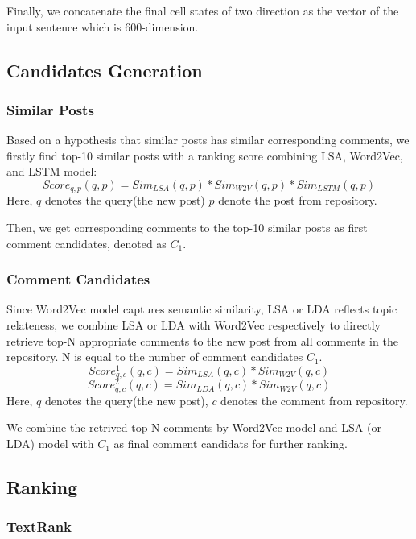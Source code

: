 \documentclass{sig-alternate}
\begin{document}
Finally, we concatenate the final cell states of two direction as the vector of 
the input sentence which is 600-dimension.

\subsection{Candidates Generation}

\subsubsection{Similar Posts}
Based on a hypothesis that similar posts has similar corresponding comments, we firstly find top-10 similar posts with a ranking score combining LSA, Word2Vec, and LSTM model:
\begin{equation}
   Score_{q,p}(q, p) = Sim_{LSA}(q, p) * Sim_{W2V}(q, p) * Sim_{LSTM}(q, p)
\end{equation}
Here, $q$ denotes the query(the new post) $p$ denote the post from repository.

Then, we get corresponding comments to the top-10 similar posts as first comment candidates, denoted as $C_1$.

\subsubsection{Comment Candidates}
Since Word2Vec model captures semantic similarity, LSA or LDA reflects topic relateness, we combine LSA or LDA with Word2Vec respectively to directly retrieve top-N appropriate comments to the new post from all comments in the repository. N is equal to the number of comment candidates $C_1$. 
\begin{equation}
   Score_{q,c}^1(q, c) = Sim_{LSA}(q, c) * Sim_{W2V}(q, c)
\end{equation}
\begin{equation}
   Score_{q,c}^2(q, c) = Sim_{LDA}(q, c) * Sim_{W2V}(q, c)
\end{equation}
Here, $q$ denotes the query(the new post), $c$ denotes the comment from repository.

We combine the retrived top-N comments by Word2Vec model and LSA (or LDA) model with $C_1$ as final comment candidats for further ranking.

\subsection{Ranking}

\subsubsection{TextRank}
\end{document}

